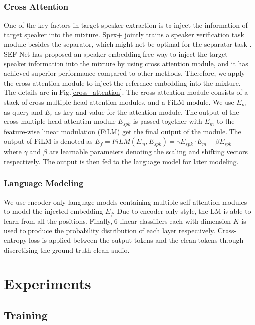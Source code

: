 \documentclass[conference]{IEEEtran}
\begin{document}
\subsubsection{Cross Attention}
One of the key factors in target speaker extraction is to 
inject the information of target speaker 
into the mixture. Spex+ \cite{spex_plus} jointly trains a speaker verification task module 
besides the separator, which might not be optimal for the separator task \cite{sef_net}. SEF-Net \cite{sef_net} has proposed an speaker embedding free way to inject the 
target speaker information into the mixture by using cross attention module, and it has 
achieved superior performance compared to other methods. Therefore, we apply 
the cross attention module to inject the reference embedding into the mixture. The details 
are in Fig.\ref{cross_attention}.
The cross attention module consists of a stack of cross-multiple head attention modules, 
and a FiLM module. 
We use \(E_m\) as query and \(E_r\) as key and value for 
the attention module. The output of the cross-multiple head attention module \(E_{spk}\)
is passed together with \(E_m\) to the feature-wise linear modulation (FiLM) get the final output of the module. The output of 
FiLM is denoted as \(E_f = FiLM(E_m, E_{spk}) = \gamma E_{spk} \cdot E_m  + \beta E_{spk} \) where 
\(\gamma\) and \(\beta\) are learnable parameters denoting the scaling and shifting vectors 
respectively. The output is then fed to the language model for later modeling.  
\subsubsection{Language Modeling}
We use encoder-only language models containing multiple self-attention modules to model the injected 
embedding \(E_f\). Due to encoder-only style, the LM is able to learn from all the positions. 
Finally, 6 linear classifiers each with dimension \(K\) is used to produce the probability 
distribution of each layer respectively.
Cross-entropy loss is applied between 
the output tokens and the clean tokens through discretizing the 
ground truth clean audio. 

\section{Experiments}

\subsection{Training}
\end{document}
